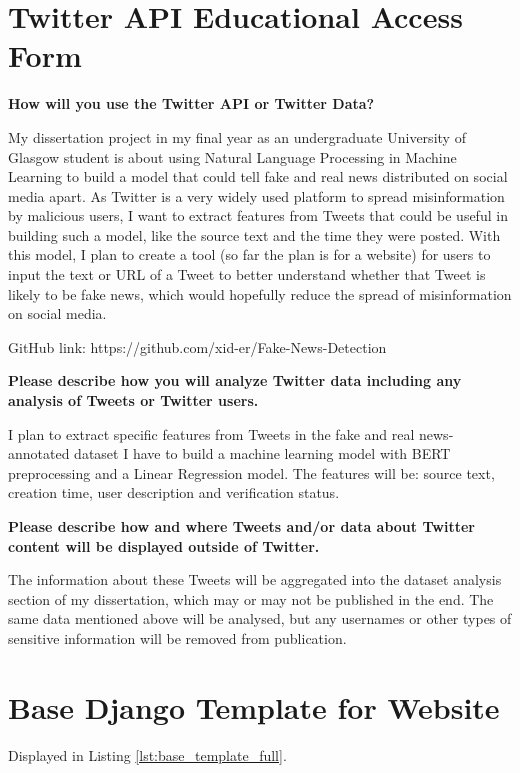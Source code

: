 \documentclass{l4proj}
\begin{document}
\begin{appendices}

\chapter{Twitter API Educational Access Form}
\label{app:Twitter_Education}

\textbf{How will you use the Twitter API or Twitter Data?}

My dissertation project in my final year as an undergraduate University of Glasgow student is about using Natural Language Processing in Machine Learning to build a model that could tell fake and real news distributed on social media apart. As Twitter is a very widely used platform to spread misinformation by malicious users, I want to extract features from Tweets that could be useful in building such a model, like the source text and the time they were posted. With this model, I plan to create a tool (so far the plan is for a website) for users to input the text or URL of a Tweet to better understand whether that Tweet is likely to be fake news, which would hopefully reduce the spread of misinformation on social media.

GitHub link: https://github.com/xid-er/Fake-News-Detection

\textbf{Please describe how you will analyze Twitter data including any analysis of Tweets or Twitter users.}

I plan to extract specific features from Tweets in the fake and real news-annotated dataset I have to build a machine learning model with BERT preprocessing and a Linear Regression model. The features will be: source text, creation time, user description and verification status.

\textbf{Please describe how and where Tweets and/or data about Twitter content will be displayed outside of Twitter.}

The information about these Tweets will be aggregated into the dataset analysis section of my dissertation, which may or may not be published in the end. The same data mentioned above will be analysed, but any usernames or other types of sensitive information will be removed from publication.


\chapter{Base Django Template for Website}
\label{app:base_template}

Displayed in Listing \ref{lst:base_template_full}.


\end{appendices}
\end{document}
